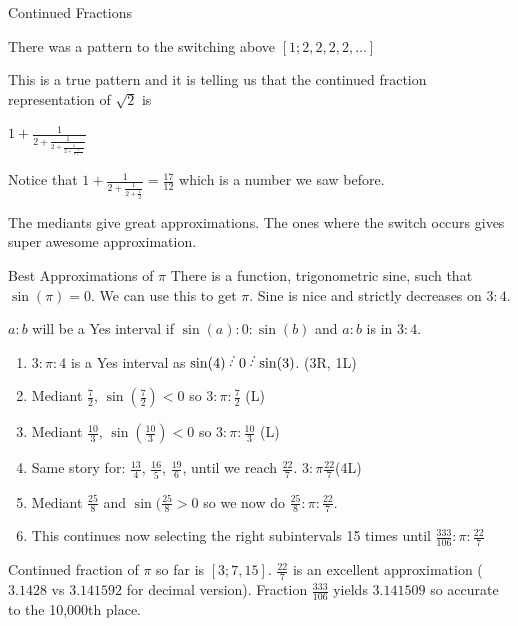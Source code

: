 \documentclass{beamer}
\begin{document}
\begin{frame}{Continued Fractions}

There was a pattern to the switching above $[1; 2, 2, 2, 2, \ldots ]$

This is a true pattern and it is telling us that the continued fraction representation of $\sqrt{2}$ is

$1 + \frac{1}{2 + \frac{1}{2 + \frac{1}{2 + \frac{1}{2 + \ldots}}}}$

Notice that $1 + \frac{1}{2 + \frac{1}{2 + \frac{1}{2}}} = \frac{17}{12}$  which is a number we saw before. 

The mediants give great approximations. The ones where the switch occurs gives super awesome approximation. 

\end{frame}

\begin{frame}{Best Approximations of $\pi$}
    There is a function, trigonometric sine, such that $\sin(\pi) = 0$. We can use this to get $\pi$. Sine is nice and strictly decreases on $3:4$. 

    $a:b$ will be a Yes interval if  $\sin(a):0:\sin(b)$ and $a:b$ is in $3:4$.

    \begin{enumerate}
        \item $3:\pi:4$ is a Yes interval as $\sin(4) \lte  0 \lte \sin(3)$. (3R, 1L)
        \item Mediant $\frac{7}{2}$, $\sin(\frac{7}{2}) < 0$ so $3:\pi:\frac{7}{2}$ (L)
        \item Mediant $\frac{10}{3}$, $\sin(\frac{10}{3}) < 0$ so $3:\pi:\frac{10}{3}$ (L)
        \item Same story for: $\frac{13}{4}$, $\frac{16}{5}$, $\frac{19}{6}$, until we reach $\frac{22}{7}$. $3:\pi\frac{22}{7}$(4L)
        \item Mediant $\frac{25}{8}$ and $\sin(\frac{25}{8} > 0$ so we now do $\frac{25}{8}:\pi:\frac{22}{7}$.
        \item This continues now selecting the right subintervals 15 times until $\frac{333}{106}:\pi:\frac{22}{7}$ 
    \end{enumerate}

    Continued fraction of $\pi$ so far is $[3; 7, 15]$. $\frac{22}{7}$ is an excellent approximation ($3.1428$ vs $3.141592$ for decimal version). Fraction $\frac{333}{106}$ yields $3.141509$ so accurate to the 10,000th place.  

\end{frame}
\end{document}
